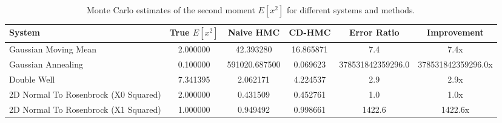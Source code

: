 \begin{table}[h]
\centering
\caption{Monte Carlo estimates of the second moment $E[x^2]$ for different systems and methods.}
\label{tab:second_moment_results}
\begin{tabular}{lccccc}
\toprule
System & True $E[x^2]$ & Naive HMC & CD-HMC & Error Ratio & Improvement \\
\midrule
Gaussian Moving Mean & 2.000000 & 42.393280 & 16.865871 & 7.4 & 7.4x \\
Gaussian Annealing & 0.100000 & 591020.687500 & 0.069623 & 378531842359296.0 & 378531842359296.0x \\
Double Well & 7.341395 & 2.062171 & 4.224537 & 2.9 & 2.9x \\
2D Normal To Rosenbrock (X0 Squared) & 2.000000 & 0.431509 & 0.452761 & 1.0 & 1.0x \\
2D Normal To Rosenbrock (X1 Squared) & 1.000000 & 0.949492 & 0.998661 & 1422.6 & 1422.6x \\
\bottomrule
\end{tabular}
\end{table}